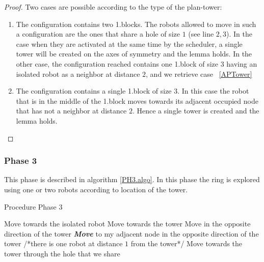 \documentclass[12pt]{llncs}
\begin{document}
\begin{proof}
Two cases are possible according to the type of the plan-tower:
\begin{enumerate}
\item{The configuration contains two 1.blocks}. The robots allowed to move in such a configuration are the ones that share a hole of size $1$ (see line $2,3$). In the case when they are activated at the same time by the scheduler, a single tower will be created on the axes of symmetry and the lemma holds. In the other case, the configuration reached contains one 1.block of size $3$ having an isolated robot as a neighbor at distance $2$, and we retrieve case ~\ref{APTower} 
\item\label{APTower}{The configuration contains a single 1.block of size $3$}. In this case the robot that is in the middle of the 1.block moves towards its adjacent occupied node that has not a neighbor at distance $2$. Hence a single tower is created and the lemma holds.
\end{enumerate}
\end{proof}
\subsubsection{\textbf{Phase 3}}

This phase is described in algorithm \ref{PH3.algo}. In this phase the ring is explored using one or two robots according to location of the tower.

\begin{algorithm}[H]
\caption{Procedure Phase 3}
\label{PH3.algo}
\begin{algorithmic}[1]
                 \State Move towards the isolated robot 
             \EndIf
        \EndIf
                   \State Move towards the tower
               \Else
                    \State Move in the opposite direction of the tower
               \EndIf
    \Else
                    \State \textbf{\textit{Move}} to my adjacent node in the opposite direction of the tower
                \EndIf
           \EndIf
    \EndIf
\Else /*there is one robot at distance $1$ from the tower*/
         \State Move towards the tower through the hole that we share
     \EndIf
\EndIf


\end{algorithmic}
\end{algorithm}   
\end{document}
